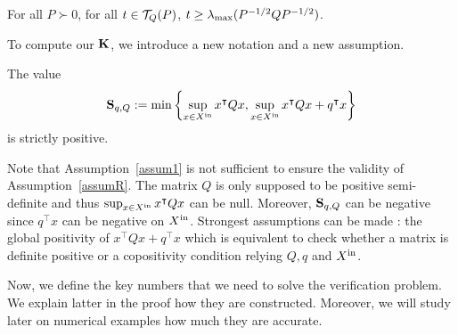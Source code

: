 \documentclass[10pt]{article}
\begin{document}
\begin{prop}
For all $P\succ 0$, for all $t\in\mathcal{T}_{Q}(P)$, $t\geq \lambda_{\operatorname{max}}(P^{-1/2} Q P^{-1/2})$.
\end{prop}
\begin{comment}
\begin{prop}
For all matrix $A$ of size $d\times d$ such that the spectral radius is strictly smaller than 1. For all symmetric matrix $Q$ of size $d\times d$: 
\begin{enumerate}
\item For all positive reals $t,t'$ such that $t\leq t'$, $\displaystyle{\lyat{A,Q}}\subseteq \displaystyle{\mathcal{L}_{A,Q}(t')}$;
\item For all $P\succ 0$, $\lmin{P}^{-1}\lmax{Q}\in\conq(P)$;
\item $\displaystyle{\bigcup_{t>0} \lyat{A,Q}}=\displaystyle{\lyap{A}}$.
\end{enumerate}
\end{prop}
\end{comment}
To compute our $\mathbf{K}$, we introduce a new notation and a new assumption. 
 \begin{assumption}
\label{assumR}
The value \[\mathbf{S}_{q,Q}:=\min\left\{\sup_{x\in X^\mathrm{in}} x^\intercal Q x , \sup_{x\in X^\mathrm{in}} x^\intercal Q x+q^\intercal x\right\}\] is strictly positive.
\end{assumption}

Note that Assumption~\ref{assum1} is not sufficient to ensure the validity of Assumption~\ref{assumR}. The matrix $Q$ is only supposed to be positive semi-definite and thus $\sup_{x\in X^\mathrm{in}} x^\intercal Q x$ can be null. Moreover, $\mathbf{S}_{q,Q}$ can be negative since $q^\intercal x$ can be negative on $X^\mathrm{in}$. Strongest assumptions can be made : the global positivity of $x^\intercal Q x+q^\intercal x$ which is equivalent to check whether a matrix is definite positive or a copositivity condition relying $Q,q$ and $X^\mathrm{in}$. 


Now, we define the key numbers that we need to solve the verification problem. We explain latter in the proof how they are constructed. Moreover, we will study later on numerical examples how much they are accurate.  
\end{document}
